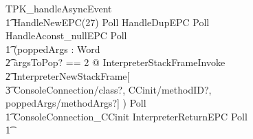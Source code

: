 \begin{figure}[tp!]
  \centering
  \setlength{\zedtab}{0.4cm}
  \setlength{\zedindent}{0pt}
  \setlength{\zedleftsep}{0pt}
  \setlength{\abovedisplayskip}{0pt}
  \setlength{\belowdisplayskip}{0pt}
  \setlength{\abovedisplayshortskip}{0pt}
  \setlength{\belowdisplayshortskip}{0pt}
  \begin{circusaction}
    TPK\_handleAsyncEvent \circdef \\
    \t1 HandleNewEPC(27) \circseq Poll \circseq HandleDupEPC \circseq Poll \circseq  HandleAconst\_nullEPC \circseq Poll \circseq \\
    \t1 (\circvar poppedArgs : \seq Word \circspot \\
    \t2 \lschexpract \exists argsToPop? == 2 @ InterpreterStackFrameInvoke \rschexpract \circseq \\
    \t2 \lschexpract InterpreterNewStackFrame[\\
    \t3 ConsoleConnection/class?, CCinit/methodID?, poppedArgs/methodArgs?] \rschexpract) \circseq Poll \circseq \\
    \t1 ConsoleConnection\_CCinit \circseq \lschexpract InterpreterReturnEPC \rschexpract \circseq Poll \circseq \\
    \t1 {} \cdots {} \\

\end{circusaction}
\end{figure}
